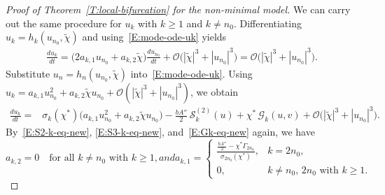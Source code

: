 \documentclass[11pt]{article} %
\theoremstyle{remark}
\theoremstyle{remark}
\numberwithin{equation}{section}
\numberwithin{figure}{section}
\numberwithin{table}{section}
\begin{document}
\begin{proof}[Proof of Theorem~\ref{T:local-bifurcation}  for the non-minimal model]
  We can carry out the same procedure for $u_k$ with $k \ge 1$ and $k \ne n_0$.
  Differentiating $u_k = h_k(u_{n_0}, \tilde{\chi})$ and
  using~\eqref{E:mode-ode-uk} yields
  \begin{align}\label{E:duk-center}
    \frac{d u_k}{dt}
    = \Big(2 a_{k,1} u_{n_0} + a_{k,2} \tilde{\chi}\Big)\frac{d u_{n_0}}{dt}
    + \mathcal{O}\Big(|\tilde{\chi}|^3 +
    |u_{n_0}|^3\Big)=\mathcal{O}\Big(|\tilde{\chi}|^3 + |u_{n_0}|^3\Big).
  \end{align}
  Substitute $u_n = h_n(u_{n_0}, \tilde{\chi})$ into~\eqref{E:mode-ode-uk}. Using
  $u_k = a_{k,1}u_{n_0}^2 + a_{k,2}\tilde{\chi}u_{n_0} +
  \mathcal{O}(|\tilde{\chi}|^3 + |u_{n_0}|^3)$, we obtain
  \begin{align}\label{E:duk-expanded}
    \frac{d u_k}{dt}
    = & \sigma_k(\chi^*)\Big(a_{k,1} u_{n_0}^2 + a_{k,2} \tilde{\chi} u_{n_0}
    \Big)
    - \frac{bA''}{2}\,\mathcal{S}^{(2)}_k(u) + \chi^*\,\mathcal{G}_k(u,v)
    + \mathcal{O}\Big(|\tilde{\chi}|^3 + |u_{n_0}|^3\Big).
  \end{align}
  By~\eqref{E:S2-k-eq-new}, \eqref{E:S3-k-eq-new}, and~\eqref{E:Gk-eq-new}
  again, we have
  \begin{subequations}\label{E:a_k,i}
    \begin{equation}\label{E:a_k,i-zero}
      a_{k,2} = 0 \quad \text{for all } k \ne n_0 \text{ with } k \ge 1,
    \end{equation}
    and
    \begin{equation}\label{E:a_k,i>0}
      a_{k,1}
      = \begin{cases}
        \displaystyle
        \frac{\frac{bA''}{2} - \chi^*\Gamma_{2n_0}}
        {\sigma_{2n_0}(\chi^*)},
        & k = 2 n_0, \\
        0, & k \ne n_0,\, 2 n_0 \text{ with } k \ge 1.
      \end{cases}
    \end{equation}
  \end{subequations}



\end{proof}
\end{document}
